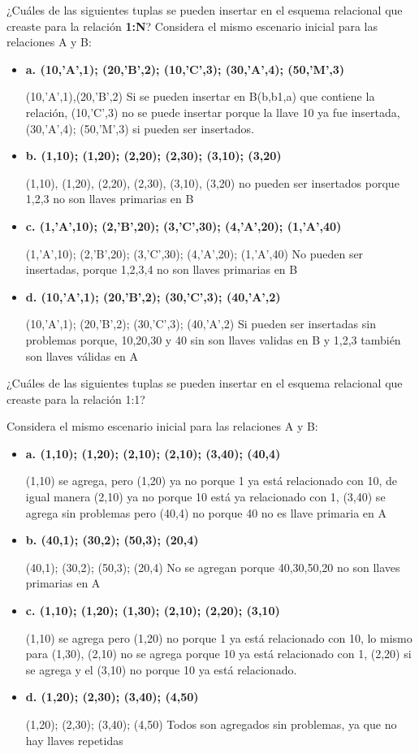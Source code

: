 \documentclass{article}
\begin{document}
¿Cuáles de las siguientes tuplas se pueden insertar en el esquema relacional que creaste para la relación \textbf{1:N}?
Considera el mismo escenario inicial para las relaciones A y B:

\begin{itemize}
    \item \textbf{a. (10,’A’,1); (20,’B’,2); (10,’C’,3); (30,’A’,4); (50,’M’,3)}
    \par 
    (10,’A’,1),(20,’B’,2) Si se pueden insertar en B(b,b1,a) que contiene la relación, (10,’C’,3) no se puede insertar porque la llave 10 ya fue insertada, (30,’A’,4); (50,’M’,3) si pueden ser insertados.
    
    \item \textbf{b. (1,10); (1,20); (2,20); (2,30); (3,10); (3,20)}
    \par (1,10), (1,20), (2,20), (2,30), (3,10), (3,20) no pueden ser insertados
    porque 1,2,3 no son llaves primarias en B
    \item \textbf{c. (1,’A’,10); (2,’B’,20); (3,’C’,30); (4,’A’,20); (1,’A’,40)} \par
    (1,’A’,10); (2,’B’,20); (3,’C’,30); (4,’A’,20); (1,’A’,40) No pueden ser
    insertadas, porque 1,2,3,4 no son llaves primarias en B
    \item \textbf{d. (10,’A’,1); (20,’B’,2); (30,’C’,3); (40,’A’,2)}
    \par
    (10,’A’,1); (20,’B’,2); (30,’C’,3); (40,’A’,2) Si pueden ser insertadas sin
    problemas porque, 10,20,30 y 40 sin son llaves validas en B y 1,2,3 también
    son llaves válidas en A
\end{itemize}
¿Cuáles de las siguientes tuplas se pueden insertar en el esquema relacional que creaste para la relación 1:1?\par
Considera el mismo escenario inicial para las relaciones A y B:
\begin{itemize}
    \item \textbf{a. (1,10); (1,20); (2,10); (2,10); (3,40); (40,4)}
    \par (1,10) se agrega, pero (1,20) ya no porque 1 ya está relacionado con 10, de igual manera (2,10) ya no porque 10 está ya relacionado con 1,
    (3,40) se agrega sin problemas pero (40,4) no porque 40 no es llave primaria en A
    \item \textbf{b. (40,1); (30,2); (50,3); (20,4)}
    \par (40,1); (30,2); (50,3); (20,4) No se agregan porque 40,30,50,20 no son llaves primarias en A
    \item \textbf{c. (1,10); (1,20); (1,30); (2,10); (2,20); (3,10)}
    \par (1,10) se agrega pero (1,20) no porque 1 ya está relacionado con 10,
    lo mismo para (1,30), (2,10) no se agrega porque 10 ya está relacionado con 1, (2,20) si se agrega y el (3,10) no porque 10 ya está relacionado.
    \item \textbf{d. (1,20); (2,30); (3,40); (4,50)}
    \par (1,20); (2,30); (3,40); (4,50) Todos son agregados sin problemas, ya que no hay llaves repetidas
\end{itemize}
\end{document}

